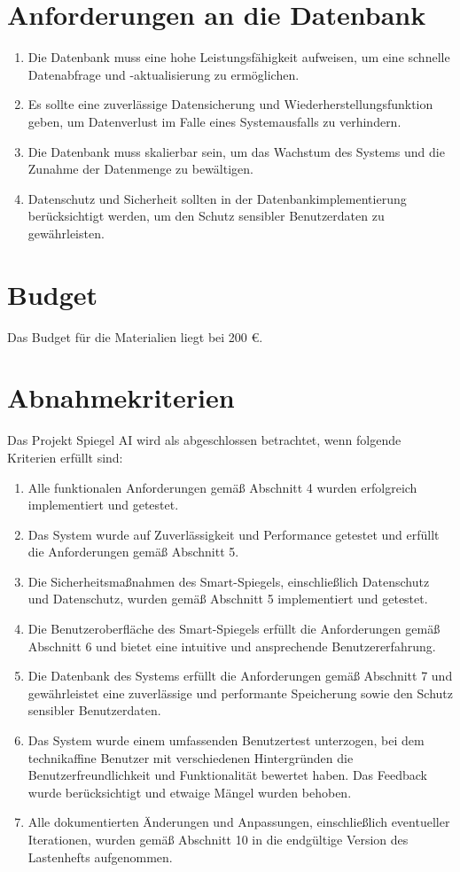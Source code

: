 \documentclass{article}
\begin{document}
\section{Anforderungen an die Datenbank}
\begin{enumerate}[label=\textbf{D\arabic*:}]
    \item Die Datenbank muss eine hohe Leistungsfähigkeit aufweisen, um eine schnelle Datenabfrage und -aktualisierung zu ermöglichen.
    \item Es sollte eine zuverlässige Datensicherung und Wiederherstellungsfunktion geben, um Datenverlust im Falle eines Systemausfalls zu verhindern.
    \item Die Datenbank muss skalierbar sein, um das Wachstum des Systems und die Zunahme der Datenmenge zu bewältigen.
    \item Datenschutz und Sicherheit sollten in der Datenbankimplementierung berücksichtigt werden, um den Schutz sensibler Benutzerdaten zu gewährleisten.
\end{enumerate}

\section{Budget}
Das Budget für die Materialien liegt bei 200 €.

\section{Abnahmekriterien}
Das Projekt Spiegel AI wird als abgeschlossen betrachtet, wenn folgende Kriterien erfüllt sind:

\begin{enumerate}
    \item Alle funktionalen Anforderungen gemäß Abschnitt 4 wurden erfolgreich implementiert und getestet.
    \item Das System wurde auf Zuverlässigkeit und Performance getestet und erfüllt die Anforderungen gemäß Abschnitt 5.
    \item Die Sicherheitsmaßnahmen des Smart-Spiegels, einschließlich Datenschutz und Datenschutz, wurden gemäß Abschnitt 5 implementiert und getestet.
    \item Die Benutzeroberfläche des Smart-Spiegels erfüllt die Anforderungen gemäß Abschnitt 6 und bietet eine intuitive und ansprechende Benutzererfahrung.
    \item Die Datenbank des Systems erfüllt die Anforderungen gemäß Abschnitt 7 und gewährleistet eine zuverlässige und performante Speicherung sowie den Schutz sensibler Benutzerdaten.
    \item Das System wurde einem umfassenden Benutzertest unterzogen, bei dem technikaffine Benutzer mit verschiedenen Hintergründen die Benutzerfreundlichkeit und Funktionalität bewertet haben. Das Feedback wurde berücksichtigt und etwaige Mängel wurden behoben.
    \item Alle dokumentierten Änderungen und Anpassungen, einschließlich eventueller Iterationen, wurden gemäß Abschnitt 10 in die endgültige Version des Lastenhefts aufgenommen.
\end{enumerate}
\end{document}
